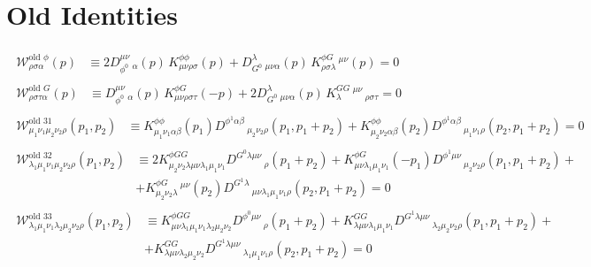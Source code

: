 \documentclass[11pt, oneside]{article}   	%
\newcommand{\W}{\mathcal{W}}
\begin{document}
\section{Old Identities}
\begin{align} \begin{split} \W^{\text{old }\phi}_{\rho\sigma\alpha}(p)
    &\equiv
      2D_{\phi^0}^{\mu\nu}\,_{\alpha}(p)\,K^{\phi\phi}_{\mu\nu\rho\sigma}(p)
    + D_{G^0}^{\lambda}\,_{\mu\nu\alpha}(p)\,K^{\phi G}_{\rho\sigma\lambda}\,^{\mu\nu}(p)
    = 0  \end{split} \\[1em]
    \begin{split}  \W^{\text{old } G} _{\rho\sigma\tau\alpha}(p)
    &\equiv
      D_{\phi^0}^{\mu\nu}\,_{\alpha}(p)\,K^{\phi G}_{\mu\nu\rho\sigma\tau} (-p)
    + 2D_{G^0}^{\lambda}\,_{\mu\nu\alpha}(p)\,K^{GG}_{\lambda}\,^{\mu\nu}\,_{\rho\sigma\tau}
    = 0 \end{split} \\[1em]
    \begin{split} \W^{\text{old }31}_{\mu_1 \nu_ 1 \mu_2 \nu_2 \rho} (p_1 , p_2 ) &\equiv  K^{\phi\phi}_{\mu_1 \nu_ 1 \alpha \beta} (p_{1} ) D^{\phi^{1} \alpha \beta}\,_{\mu_2 \nu_2 \rho} (p_{1}, p_{1} + p_{2}) + K^{\phi\phi}_{\mu_2 \nu_ 2 \alpha \beta} (p_{2}) D^{\phi^{1} \alpha \beta}\,_{\mu_1 \nu_ 1 \rho} (p_{2},p_{1}+p_{2}) = 0 \end{split} \\[1em]
 \begin{split} \W^{\text{old }32}_{\lambda_1 \mu_1 \nu_ 1 \mu_2 \nu_2 \rho} (p_1 , p_2 ) &\equiv 2K^{\phi G G}_{\mu_2 \nu_2 \lambda \mu \nu \lambda_1 \mu_1 \nu_1} D^{G^{0} \lambda \mu \nu}\,_{\rho} (p_1 + p_2 ) + K^{\phi G}_{\mu \nu \lambda_1 \mu_1 \nu_1 } (-p_1 ) D^{\phi^{1} \mu \nu}\,_{\mu_2 \nu_2 \rho} (p_1 , p_1 + p_2 ) + \\ &+ K^{\phi G}_{\mu_2 \nu_2 \lambda}\,^{\mu\nu}(p_2 )D^{G^{1} \lambda}\,_{\mu\nu\lambda_1 \mu_1 \nu_1 \rho} (p_2 , p_1 + p_2 ) = 0\end{split} \\[1em]
\begin{split} \W^{\text{old }33}_{\lambda_1 \mu_1 \nu_ 1 \lambda_2 \mu_2 \nu_2 \rho} (p_1 , p_2 )& \equiv K^{\phi G G}_{\mu \nu \lambda_1 \mu_1 \nu_1 \lambda_2 \mu_2 \nu_2} D^{\phi^{0} \mu \nu}\,_{\rho} (p_1 + p_2 ) + K^{GG}_{\lambda \mu \nu \lambda_1 \mu_1 \nu_1 } D^{G^{1} \lambda \mu \nu}\,_{\lambda_2\mu_2 \nu_2 \rho} (p_1 , p_1 + p_2 ) + \\ &+ K^{GG}_{\lambda \mu\nu \lambda_2 \mu_2 \nu_2}D^{G^{1}\lambda \mu \nu}\,_{\lambda_1 \mu_1 \nu_1 \rho} (p_2 , p_1 + p_2 ) = 0\end{split} \\[1em]

\end{align}
\end{document}
